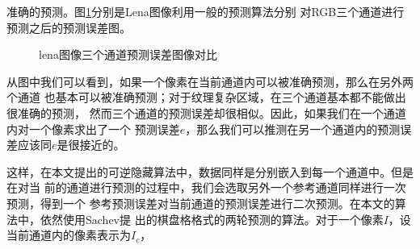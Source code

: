 准确的预测。图\ref{fig:lena_rgb_pe_compare}分别是Lena图像利用一般的预测算法分别
对RGB三个通道进行预测之后的预测误差图。
\begin{figure}[!h]
\centering 
{}
\caption{lena图像三个通道预测误差图像对比}
\label{fig:lena_rgb_pe_compare}
\end{figure}
从图中我们可以看到，如果一个像素在当前通道内可以被准确预测，那么在另外两个通道
也基本可以被准确预测；对于纹理复杂区域，在三个通道基本都不能做出很准确的预测，
然而三个通道的预测误差却很相似。因此，如果我们在一个通道内对一个像素求出了一个
预测误差$e$，那么我们可以推测在另一个通道内的预测误差应该同$e$是很接近的。
\par
这样，在本文提出的可逆隐藏算法中，数据同样是分别嵌入到每一个通道中。但是在对当
前的通道进行预测的过程中，我们会选取另外一个参考通道同样进行一次预测，得到一个
参考预测误差对当前通道的预测误差进行二次预测。在本文的算法中，依然使用Sachev提
出的棋盘格格式的两轮预测的算法。对于一个像素$I$，设当前通道内的像素表示为$I_c$，
